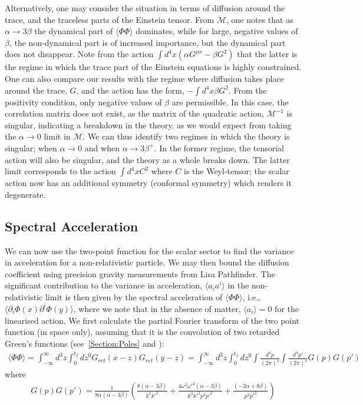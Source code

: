 \documentclass[aps,preprintnumbers,superscriptaddress,longbibliography]{revtex4-1}
\begin{document}
Alternatively, one may consider the situation in terms of diffusion around the trace, and the traceless parts of the Einstein tensor. From $\mathcal{M}$, one notes that as $\alpha\rightarrow3\beta$ the dynamical part of $\langle\Phi\Phi\rangle$ dominates, while for large, negative values of $\beta$, the non-dynamical part is of increased importance, but the dynamical part does not disappear. Note from the action $\int d^4x (\alpha G^{\mu\nu}-\beta G^2)$ that the latter is the regime in which the trace part of the Einstein equations is highly constrained. One can also compare our results with the regime where diffusion takes place around the trace, $G$, and the action has the form, $-\int d^4x\beta G^2$. From the positivity condition, only negative values of $\beta$ are permissible. In this case, the correlation matrix does not exist, as the matrix of the quadratic action, $\mathcal{M}^{-1}$ is singular, indicating a breakdown in the theory, as we would expect from taking the $\alpha \rightarrow0$ limit in $\mathcal{M}$. We can thus identify two regimes in which the theory is singular; when $\alpha\rightarrow0$ and when $\alpha\rightarrow3\beta^+$.  In the former regime, the tensorial action will also be singular, and the theory as a whole breaks down. The latter limit corresponds to the action $\int d^4x C^2$ where $C$ is the Weyl-tensor; the scalar action now has an additional symmetry (conformal symmetry) which renders it degenerate.


\subsection{Spectral Acceleration}
\label{Spectral}
We can now use the two-point function for the scalar sector to find the variance in acceleration for a non-relativistic particle. We may then bound the diffusion coefficient using precision gravity measurements from Lisa Pathfinder. The significant contribution to the variance in acceleration, $\langle a_ia^i\rangle$ in the non-relativistic limit is then given by the spectral acceleration of $\langle\Phi\Phi\rangle$, i.e.,  $\langle\partial_i\Phi(x)\partial^i\Phi(y)\rangle$, where we note that in the absence of matter, $\langle a_i \rangle=0$ for the linearised action.
We first calculate the partial Fourier transform of the two point function (in space only), assuming that it is the convolution of two retarded Green's functions (see~\ref{Section:Poles} and \cite{oppenheim2024anomalous,oppenheim2025diffusion}):
\begin{align}
\langle\Phi \Phi \rangle=\int ^{\infty}_{-\infty}d^3z\int^{t_f}_0dz^0G_{ret}(x-z)G_{ret}(y-z)=\int ^{\infty}_{-\infty}d^3z\int^{t_f}_0dz^0\int\frac{d^4p}{(2\pi)^4}\int\frac{d^4p'}{(2\pi)^4}G(p)G(p') 
\end{align}
where 
\begin{align}
    G(p)G(p')=\frac{1}{8\alpha(\alpha-3\beta)} (\frac{8(\alpha-3\beta)}{k^2k'^2}+\frac{4\omega^2\omega'^2(\alpha-3\beta)}{k^2k'^2p^2p'^2}+\frac{(-2\alpha+8\beta)}{p^2p'^2})
\end{align}
\end{document}
